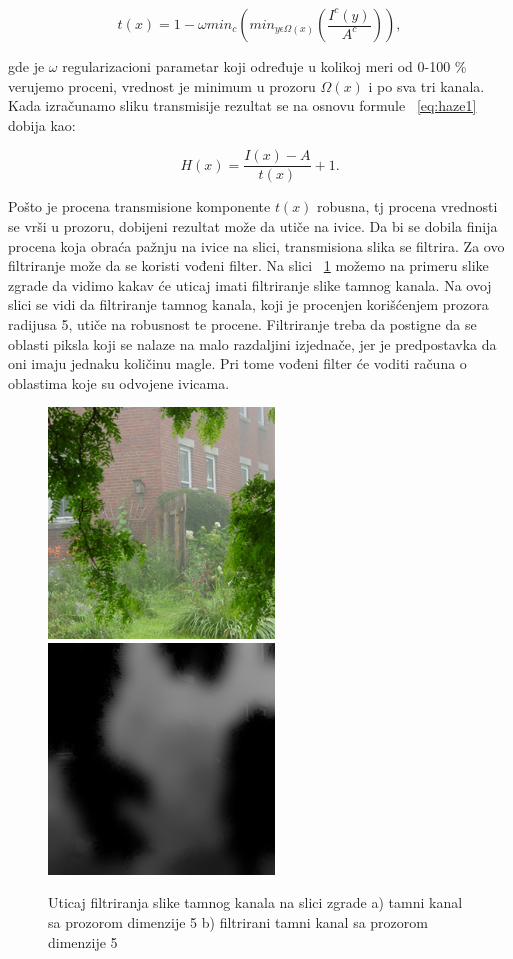 \documentclass[a4paper,12pt,titlepage]{article}
\begin{document}
\begin{equation}\label{eq:haze3}
t(x) = 1 - \omega min_c ( min_{y \epsilon \Omega (x)} (\dfrac{I^c(y)}{A^c})),
\end{equation}

gde je $\omega$ regularizacioni parametar koji određuje u kolikoj meri od 0-100 \% verujemo proceni, vrednost je minimum u prozoru $\Omega(x)$ i po sva tri kanala. Kada izračunamo sliku transmisije rezultat se na osnovu formule ~\ref{eq:haze1} dobija kao:

\begin{equation}\label{eq:haze3}
H(x) = \dfrac{I(x) - A}{t(x)} + 1.
\end{equation}

Pošto je procena transmisione komponente $t(x)$ robusna, tj procena vrednosti  se vrši u prozoru, dobijeni rezultat može da utiče na ivice. Da bi se dobila finija procena koja obraća pažnju na ivice na slici, transmisiona slika se filtrira. Za ovo filtriranje može da se koristi vođeni filter. Na slici ~\ref{FiltriraniTamniKanal} možemo na primeru slike zgrade da vidimo kakav će uticaj imati filtriranje slike tamnog kanala. Na ovoj slici se vidi da filtriranje tamnog kanala, koji je procenjen korišćenjem prozora radijusa 5, utiče na robusnost te procene. Filtriranje treba da postigne da se oblasti piksla koji se nalaze na malo razdaljini izjednače, jer je predpostavka da oni imaju jednaku količinu magle. Pri tome vođeni filter će voditi računa o oblastima koje su odvojene ivicama. 

\begin{figure}[ht!]
\centering
\includegraphics[width=60mm]{img/haze.png}
\includegraphics[width=60mm]{img/hazeDC5F.png}
\caption{Uticaj filtriranja slike tamnog kanala na slici zgrade a) tamni kanal sa prozorom dimenzije 5 b) filtrirani tamni kanal sa prozorom dimenzije 5}
\label{FiltriraniTamniKanal}
\end{figure}   
\end{document}
